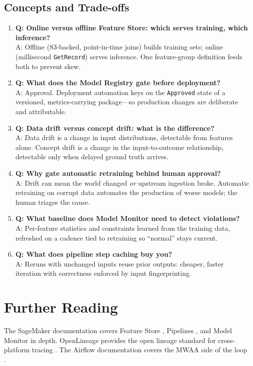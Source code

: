 \subsection{Concepts and Trade-offs}
\begin{enumerate}
    \item \textbf{Q: Online versus offline Feature Store: which serves training, which inference?}\\
    A: Offline (S3-backed, point-in-time joins) builds training sets; online (millisecond \texttt{GetRecord}) serves inference. One feature-group definition feeds both to prevent skew.
    \item \textbf{Q: What does the Model Registry gate before deployment?}\\
    A: Approval. Deployment automation keys on the \texttt{Approved} state of a versioned, metrics-carrying package---so production changes are deliberate and attributable.
    \item \textbf{Q: Data drift versus concept drift: what is the difference?}\\
    A: Data drift is a change in input distributions, detectable from features alone. Concept drift is a change in the input-to-outcome relationship, detectable only when delayed ground truth arrives.
    \item \textbf{Q: Why gate automatic retraining behind human approval?}\\
    A: Drift can mean the world changed \emph{or} upstream ingestion broke. Automatic retraining on corrupt data automates the production of worse models; the human triages the cause.
    \item \textbf{Q: What baseline does Model Monitor need to detect violations?}\\
    A: Per-feature statistics and constraints learned from the training data, refreshed on a cadence tied to retraining so ``normal'' stays current.
    \item \textbf{Q: What does pipeline step caching buy you?}\\
    A: Reruns with unchanged inputs reuse prior outputs: cheaper, faster iteration with correctness enforced by input fingerprinting.
\end{enumerate}

\section{Further Reading}
The SageMaker documentation covers Feature Store \cite{awsFeatureStoreDocs}, Pipelines \cite{awsSageMakerPipelinesDocs}, and Model Monitor \cite{awsModelMonitorDocs} in depth. OpenLineage provides the open lineage standard for cross-platform tracing \cite{openLineage}. The Airflow documentation covers the MWAA side of the loop \cite{apacheAirflow}.

